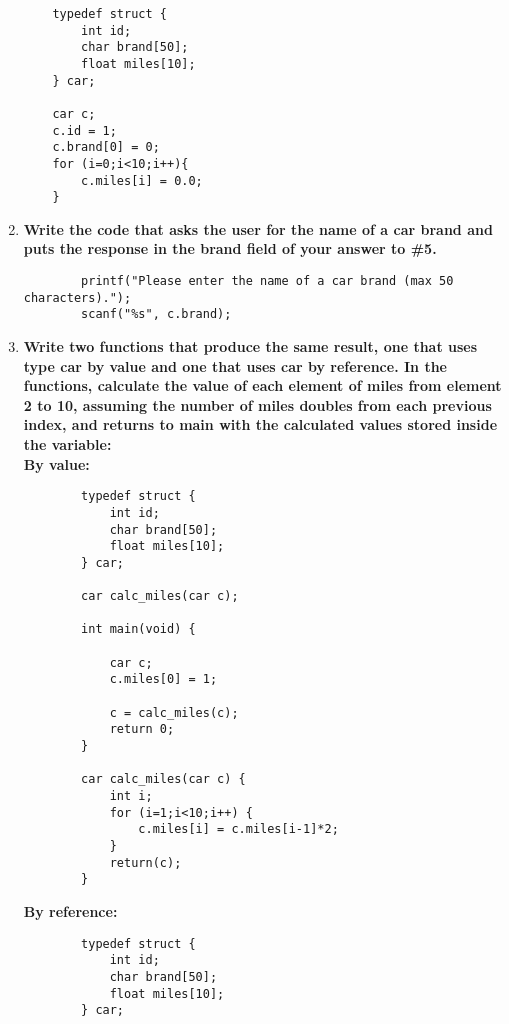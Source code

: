 \documentclass{article}
\begin{document}
\begin{enumerate}[label=\textbf{\arabic*})]
    \begin{lstlisting}
    typedef struct {
        int id;
        char brand[50];
        float miles[10];
    } car;

    car c;
    c.id = 1;
    c.brand[0] = 0;
    for (i=0;i<10;i++){
        c.miles[i] = 0.0;
    }
    \end{lstlisting}

    \item \textbf{Write the code that asks the user for the name of a car brand and puts the response in the 
    brand field of your answer to \#5.} \\
    \begin{lstlisting}
        printf("Please enter the name of a car brand (max 50 characters).");
        scanf("%s", c.brand);
    \end{lstlisting}

    \pagebreak
    \item \textbf{Write two functions that produce the same result, one that uses type car by value and one 
    that uses car by reference. In the functions, calculate the value of each element of miles 
    from element 2 to 10, assuming the number of miles doubles from each previous index, and 
    returns to main with the calculated values stored inside the variable:} \\

    \textbf{By value:} \\
    \begin{lstlisting}
        typedef struct {
            int id;
            char brand[50];
            float miles[10];
        } car;

        car calc_miles(car c);

        int main(void) {
    
            car c;
            c.miles[0] = 1;

            c = calc_miles(c);
            return 0;
        }

        car calc_miles(car c) {
            int i;
            for (i=1;i<10;i++) {
                c.miles[i] = c.miles[i-1]*2;
            }
            return(c);
        }
    \end{lstlisting}

    \textbf{By reference:} \\

    \begin{lstlisting}
        typedef struct {
            int id;
            char brand[50];
            float miles[10];
        } car;


\end{lstlisting}
\end{enumerate}
\end{document}
